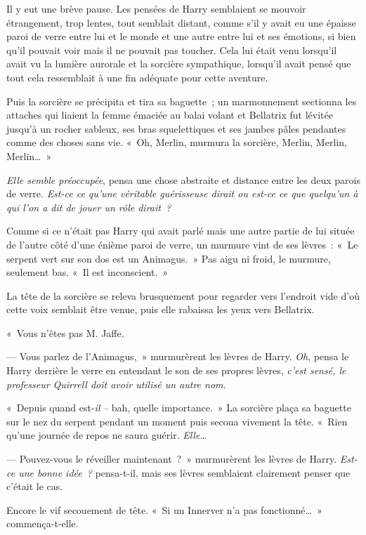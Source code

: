 Il y eut une brève pause.
Les pensées de Harry semblaient se mouvoir étrangement, trop lentes, tout semblait distant, comme s'il y avait eu une épaisse paroi de verre entre lui et le monde et une autre entre lui et ses émotions, si bien qu'il pouvait voir mais il ne pouvait pas toucher.
Cela lui était venu lorsqu'il avait vu la lumière aurorale et la sorcière sympathique, lorsqu'il avait pensé que tout cela ressemblait à une fin adéquate pour cette aventure.

Puis la sorcière se précipita et tira sa baguette~; un marmonnement sectionna les attaches qui liaient la femme émaciée au balai volant et Bellatrix fut lévitée jusqu'à un rocher sableux, ses bras squelettiques et ses jambes pâles pendantes comme des choses sans vie.
«~Oh, Merlin, murmura la sorcière, Merlin, Merlin, Merlin…~»

\emph{Elle semble préoccupée}, pensa une chose abstraite et distance entre les deux parois de verre.
\emph{Est-ce ce qu'une véritable guérisseuse dirait ou est-ce ce que quelqu'un à qui l'on a dit de jouer un rôle dirait~?}

Comme si ce n'était pas Harry qui avait parlé mais une autre partie de lui située de l'autre côté d'une énième paroi de verre, un murmure vint de ses lèvres~: «~Le serpent vert sur son dos est un Animagus.~»
Pas aigu ni froid, le murmure, seulement bas.
«~Il est inconscient.~»

La tête de la sorcière se releva brusquement pour regarder vers l'endroit vide d'où cette voix semblait être venue, puis elle rabaissa les yeux vers Bellatrix.

«~Vous n'êtes pas M. Jaffe.

--- Vous parlez de l'Animagus,~» murmurèrent les lèvres de Harry.
\emph{Oh}, pensa le Harry derrière le verre en entendant le son de ses propres lèvres, \emph{c'est sensé, le professeur Quirrell doit avoir utilisé un autre nom.}

«~Depuis quand est-\emph{il} -- bah, quelle importance.~»
La sorcière plaça sa baguette sur le nez du serpent pendant un moment puis secoua vivement la tête.
«~Rien qu'une journée de repos ne saura guérir.
\emph{Elle…}

--- Pouvez-vous le réveiller maintenant~?~»
murmurèrent les lèvres de Harry.
\emph{Est-ce une bonne idée~?} pensa-t-il, mais ses lèvres semblaient clairement penser que c'était le cas.

Encore le vif secouement de tête.
«~Si un Innerver n'a pas fonctionné…~»
commença-t-elle.

